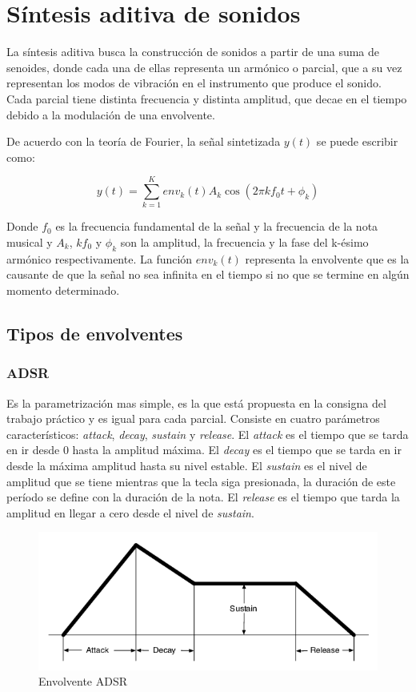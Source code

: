 \documentclass[assd_tp2_main.tex]{subfiles}
\begin{document}
\section{S\'intesis aditiva de sonidos}

La s\'intesis aditiva busca la construcci\'on de sonidos a partir de una suma de senoides, donde cada una de ellas representa un arm\'onico o parcial, que a su vez representan los modos de vibraci\'on en el instrumento que produce el sonido. Cada parcial tiene distinta frecuencia y distinta amplitud, que decae en el tiempo debido a la modulaci\'on de una envolvente. 

De acuerdo con la teoría de Fourier, la señal sintetizada $y(t)$ se puede escribir como:

\begin{equation}\label{eqn:additive}
 {y(t) = \sum_{k = 1}^{K}env_{k}(t)A_{k}\cos\left(2 \pi k f_{0}t+\phi_{k}\right)}
\end{equation}

Donde $f_{0}$ es la frecuencia fundamental de la señal y la frecuencia de la nota musical y $A_{k}$, $kf_{0}$ y $\phi_{k}$ son la amplitud, la frecuencia y la fase del k-ésimo armónico respectivamente. La función $env_{k}(t)$ representa la envolvente que es la causante de que la señal no sea infinita en el tiempo si no que se termine en algún momento determinado.

\subsection{Tipos de envolventes}

\subsubsection{ADSR}
Es la parametrización mas simple, es la que está propuesta en la consigna del trabajo práctico y es igual para cada parcial.
Consiste en cuatro parámetros característicos: \textit{attack}, \textit{decay}, \textit{sustain} y \textit{release}.
El \textit{attack} es el tiempo que se tarda en ir desde 0 hasta la amplitud máxima.
El \textit{decay} es el tiempo que se tarda en ir desde la máxima amplitud hasta su nivel estable.
El \textit{sustain} es el nivel de amplitud que se tiene mientras que la tecla siga presionada, la duración de este período se define con la duración de la nota.
El \textit{release} es el tiempo que tarda la amplitud en llegar a cero desde el nivel de \textit{sustain}.

\begin{figure}[H]	
	\centering
	\includegraphics[scale=0.5]{graficos/adsr.png}
	\caption{Envolvente ADSR}
\end{figure}
\end{document}
